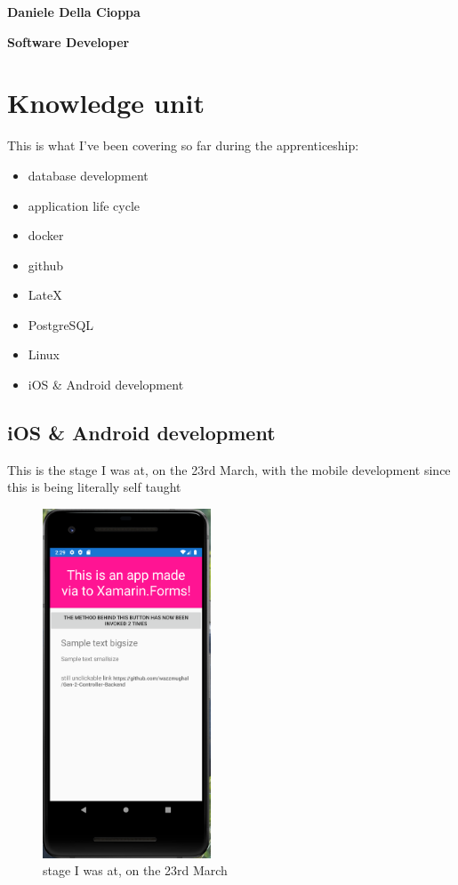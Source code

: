 \documentclass[a4paper,12pt]{article}
\begin{document}
\textbf{Daniele Della Cioppa}

\textbf{Software Developer}

\tableofcontents
\clearpage

\section{Knowledge unit}

This is what I've been covering so far during the apprenticeship:

\begin{itemize}
\item {database development}
\item {application life cycle}
\item docker
\item github 
\item LateX
\item PostgreSQL
\item Linux
\item {iOS \& Android development}
\end{itemize}
\clearpage

\subsection{iOS \& Android development}
This is the stage I was at, on the 23rd March, with the mobile development since this is being literally self taught

\begin{figure}
\includegraphics[width=5cm]{./capture-app.PNG}
\caption{stage I was at, on the 23rd March}\label{wrap-fig:1}
\end{figure} 
\end{document}
